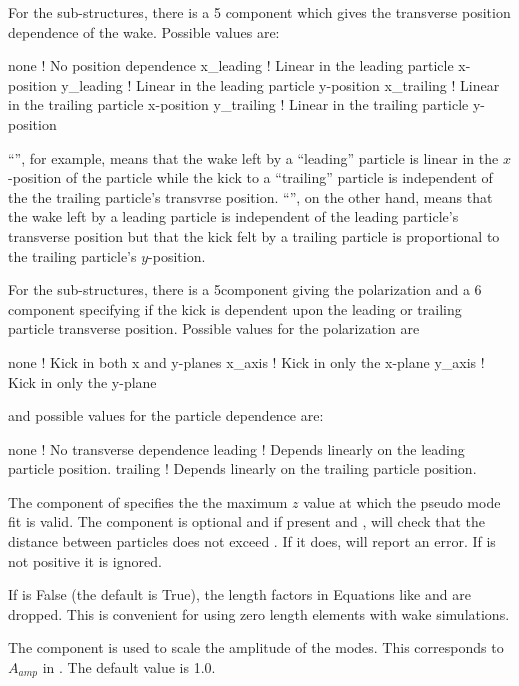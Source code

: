 For the  sub-structures, there is a 5\Th
component which gives the transverse position dependence of the wake. Possible values are:
\begin{example}
  none          ! No position dependence
  x_leading     ! Linear in the leading particle x-position
  y_leading     ! Linear in the leading particle y-position
  x_trailing    ! Linear in the trailing particle x-position
  y_trailing    ! Linear in the trailing particle y-position
\end{example}
``'', for example, means that the wake left by a ``leading'' particle is linear
in the $x$-position of the particle while the kick to a ``trailing'' particle is independent of the
the trailing particle's transvrse position. ``'', on the other hand, means that the 
wake left by a leading particle is independent of the leading particle's transverse position but that
the kick felt by a trailing particle is proportional to the trailing particle's $y$-position.

For the  sub-structures, there is a 5\Th component giving the polarization and a 6\Th
component specifying if the kick is dependent upon the leading or trailing particle transverse position.
Possible values for the polarization are
\begin{example}
  none          ! Kick in both x and y-planes
  x_axis        ! Kick in only the x-plane
  y_axis        ! Kick in only the y-plane
\end{example}
and possible values for the particle dependence are:
\begin{example}
  none          ! No transverse dependence
  leading       ! Depends linearly on the leading particle position.
  trailing      ! Depends linearly on the trailing particle position.
\end{example}

The  component of  specifies the the maximum $z$ value at which the pseudo
mode fit is valid. The  component is optional and if present and , \bmad will
check that the distance between particles does not exceed . If it does, \bmad will report
an error. If  is not positive it is ignored.

If  is False (the default is True), the length factors in Equations like
 and  are dropped. This is convenient for using zero length elements with
wake simulations.

The  component is used to scale the amplitude of the modes. This corresponds to $A_{amp}$
in . The default value is 1.0.

